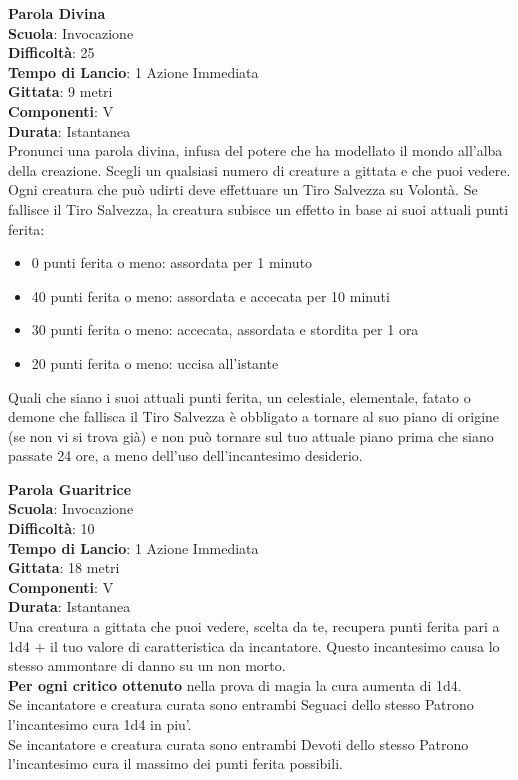 \begin{multicols}{2}
\medskip\textbf{Parola Divina}\\
\textbf{Scuola}: Invocazione\\
\textbf{Difficoltà}:  25\\
\textbf{Tempo di Lancio}: 1 Azione Immediata\\
\textbf{Gittata}: 9 metri\\
\textbf{Componenti}: V\\
\textbf{Durata}: Istantanea\\
Pronunci una parola divina, infusa del potere che ha modellato il mondo all'alba della creazione. Scegli un qualsiasi numero di creature a gittata e che puoi vedere. Ogni creatura che può udirti deve effettuare un Tiro Salvezza su Volontà. Se fallisce il Tiro Salvezza, la creatura subisce un effetto in base ai suoi attuali punti ferita:
\medskip
\begin{itemize}
\item	
0 punti ferita o meno: assordata per 1 minuto
\item	
40 punti ferita o meno: assordata e accecata per 10 minuti
\item	
30 punti ferita o meno: accecata, assordata e stordita per 1 ora
\item	
20 punti ferita o meno: uccisa all'istante
\end{itemize}
\medskip
Quali che siano i suoi attuali punti ferita, un celestiale, elementale, fatato o demone che fallisca il Tiro Salvezza è obbligato a tornare al suo piano di origine (se non vi si trova già) e non può tornare sul tuo attuale piano prima che siano passate 24 ore, a meno dell'uso dell'incantesimo desiderio.

\medskip\textbf{Parola Guaritrice}\\
\textbf{Scuola}: Invocazione\\
\textbf{Difficoltà}:  10\\
\textbf{Tempo di Lancio}: 1 Azione Immediata\\
\textbf{Gittata}: 18 metri\\
\textbf{Componenti}: V\\
\textbf{Durata}: Istantanea\\
Una creatura a gittata che puoi vedere, scelta da te, recupera punti ferita pari a 1d4 + il tuo valore di caratteristica da incantatore. Questo incantesimo causa lo stesso ammontare di danno su un non morto.\\
\textbf{Per ogni critico ottenuto} nella prova di magia la cura aumenta di 1d4.\\
Se incantatore e creatura curata sono entrambi Seguaci dello stesso Patrono l'incantesimo cura 1d4 in piu'.\\
Se incantatore e creatura curata sono entrambi Devoti dello stesso Patrono l'incantesimo cura il massimo dei punti ferita possibili.\\


\end{multicols}
